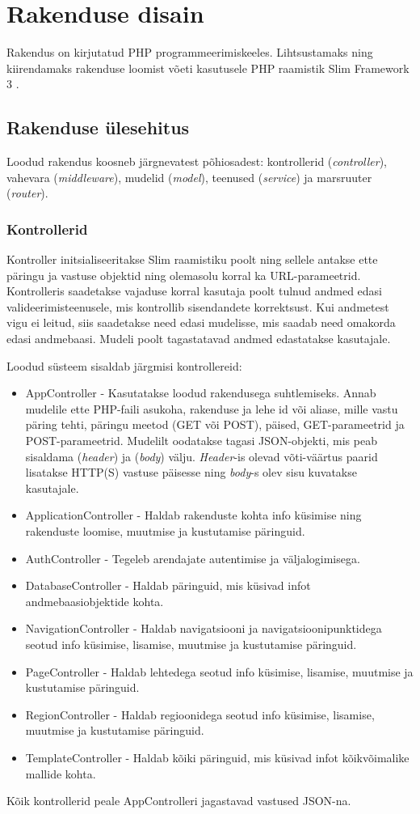 \documentclass[a4paper,12pt]{article} %
\begin{document}
\section{Rakenduse disain}
Rakendus on kirjutatud PHP programmeerimiskeeles. Lihtsustamaks ning kiirendamaks rakenduse loomist võeti kasutusele PHP raamistik Slim Framework 3 \cite{SlimFW}.
\subsection{Rakenduse ülesehitus}
Loodud rakendus koosneb järgnevatest põhiosadest: kontrollerid (\textit{controller}), vahevara (\textit{middleware}), mudelid (\textit{model}), teenused (\textit{service}) ja marsruuter (\textit{router}).
\subsubsection{Kontrollerid}
Kontroller initsialiseeritakse Slim raamistiku poolt ning sellele antakse ette päringu ja vastuse objektid ning olemasolu korral ka URL-parameetrid. Kontrolleris saadetakse vajaduse korral kasutaja poolt tulnud andmed edasi valideerimisteenusele, mis kontrollib sisendandete korrektsust. Kui andmetest vigu ei leitud, siis saadetakse need edasi mudelisse, mis saadab need omakorda edasi andmebaasi. Mudeli poolt tagastatavad andmed edastatakse kasutajale.\par
Loodud süsteem sisaldab järgmisi kontrollereid:
\begin{itemize}
\item AppController - Kasutatakse loodud rakendusega suhtlemiseks. Annab mudelile ette PHP-faili asukoha, rakenduse ja lehe id või aliase, mille vastu päring tehti, päringu meetod (GET või POST), päised, GET-parameetrid ja POST-parameetrid. Mudelilt oodatakse tagasi JSON-objekti, mis peab sisaldama (\textit{header}) ja (\textit{body}) välju. \textit{Header}-is olevad võti-väärtus paarid lisatakse HTTP(S) vastuse päisesse ning \textit{body}-s olev sisu kuvatakse kasutajale.
\item ApplicationController - Haldab rakenduste kohta info küsimise ning rakenduste loomise, muutmise ja kustutamise päringuid.
\item AuthController - Tegeleb arendajate autentimise ja väljalogimisega.
\item DatabaseController - Haldab päringuid, mis küsivad infot andmebaasiobjektide kohta.
\item NavigationController - Haldab navigatsiooni ja navigatsioonipunktidega seotud info küsimise, lisamise, muutmise ja kustutamise päringuid.
\item PageController - Haldab lehtedega seotud info küsimise, lisamise, muutmise ja kustutamise päringuid.
\item RegionController - Haldab regioonidega seotud info küsimise, lisamise, muutmise ja kustutamise päringuid.
\item TemplateController - Haldab kõiki päringuid, mis küsivad infot kõikvõimalike mallide kohta.
\end{itemize}
Kõik kontrollerid peale AppControlleri jagastavad vastused JSON-na.
\end{document}
